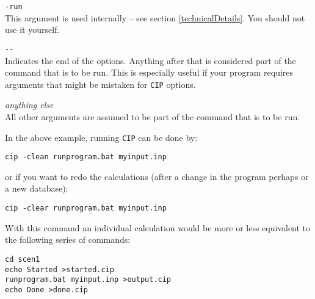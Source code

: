 \documentclass[onecolumn]{article}
\begin{document}
\noindent \verb+-run+ \\
\indent This argument is used internally -- see section
\ref{technicalDetails}. You should not use it yourself.

\noindent \verb+--+ \\
\indent Indicates the end of the options. Anything after that is
considered part of the command that is to be run. This is especially
useful if your program requires arguments that might be mistaken for
\verb+CIP+ options.

\noindent \emph{anything else} \\
\indent All other arguments are assumed to be part of the command
that is to be run.

In the above example, running \verb+CIP+ can be done by:

\begin{verbatim}
cip -clean runprogram.bat myinput.inp
\end{verbatim}

\noindent or if you want to redo the calculations (after a change in
the program perhaps or a new database):

\begin{verbatim}
cip -clear runprogram.bat myinput.inp
\end{verbatim}

With this command an individual calculation would be more or less
equivalent to the following series of commands:

\begin{verbatim}
cd scen1
echo Started >started.cip
runprogram.bat myinput.inp >output.cip
echo Done >done.cip
\end{verbatim}
\end{document}
